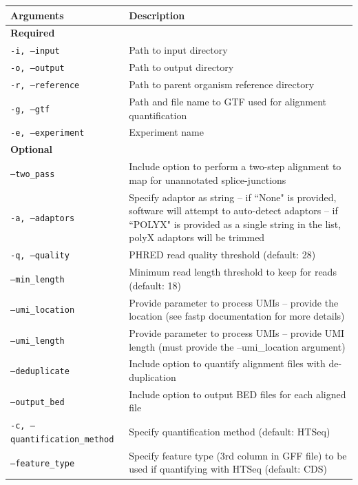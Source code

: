 \documentclass[10pt, oneside]{article}
\begin{document}
\begin{table}[!]
    \centering
{}
\begin{tabular}{p{5cm}p{13cm}}
 \textbf{Arguments} & \textbf{Description} \\
 \hline
 \textbf{Required} & \\
 \hline
 \texttt{-i, --input} & Path to input directory \\
 \hline
 \texttt{-o, --output} & Path to output directory \\
 \hline
 \texttt{-r, --reference} & Path to parent organism reference directory \\
 \hline
 \texttt{-g, --gtf} & Path and file name to GTF used for alignment quantification \\
 \hline
 \texttt{-e, --experiment} & Experiment name \\
 \hline
 \textbf{Optional} & \\
 \hline
 \texttt{--two\_pass} & Include option to perform a two-step alignment to map for unannotated splice-junctions \\
 \hline
 \texttt{-a, --adaptors} & Specify adaptor as string -- if ``None" is provided, software will attempt to auto-detect adaptors -- if ``POLYX" is provided as a single string in the list, polyX adaptors will be trimmed \\
 \hline
 \texttt{-q, --quality} & PHRED read quality threshold (default: 28) \\
 \hline
 \texttt{--min\_length} & Minimum read length threshold to keep for reads (default: 18) \\
 \hline
 \texttt{--umi\_location} & Provide parameter to process UMIs -- provide the location (see fastp documentation for more details) \\
 \hline
 \texttt{--umi\_length} & Provide parameter to process UMIs -- provide UMI length (must provide the --umi\_location argument) \\
 \hline
 \texttt{--deduplicate} & Include option to quantify alignment files with de-duplication \\
 \hline
 \texttt{--output\_bed} & Include option to output BED files for each aligned file \\
 \hline
 \texttt{-c, --quantification\_method} & Specify quantification method (default: HTSeq\cite{htseq}) \\
 \hline
 \texttt{--feature\_type} & Specify feature type (3rd column in GFF file) to be used if quantifying with HTSeq (default: CDS) \\

\end{tabular}
\end{table}
\end{document}
